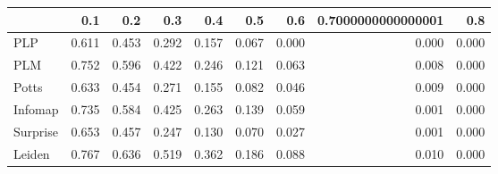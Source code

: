 \begin{tabular}{lrrrrrrrr}
\toprule
{} &   0.1 &   0.2 &   0.3 &   0.4 &   0.5 &   0.6 & 0.7000000000000001 &   0.8 \\
\midrule
PLP      & 0.611 & 0.453 & 0.292 & 0.157 & 0.067 & 0.000 &              0.000 & 0.000 \\
PLM      & 0.752 & 0.596 & 0.422 & 0.246 & 0.121 & 0.063 &              0.008 & 0.000 \\
Potts    & 0.633 & 0.454 & 0.271 & 0.155 & 0.082 & 0.046 &              0.009 & 0.000 \\
Infomap  & 0.735 & 0.584 & 0.425 & 0.263 & 0.139 & 0.059 &              0.001 & 0.000 \\
Surprise & 0.653 & 0.457 & 0.247 & 0.130 & 0.070 & 0.027 &              0.001 & 0.000 \\
Leiden   & 0.767 & 0.636 & 0.519 & 0.362 & 0.186 & 0.088 &              0.010 & 0.000 \\
\bottomrule
\end{tabular}
